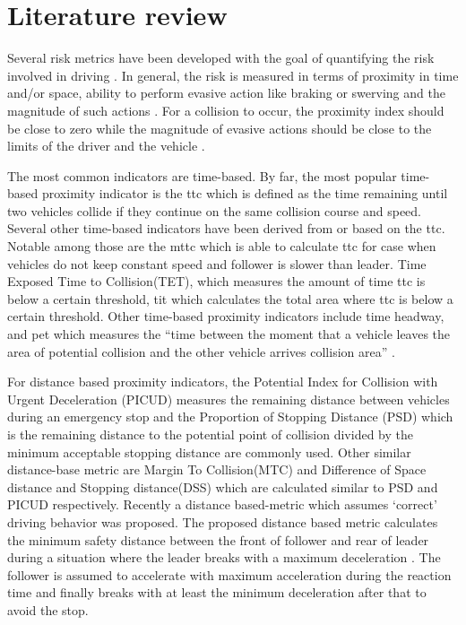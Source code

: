 \section{Literature review}
\label{sec:literature review}

Several risk metrics have been developed with the goal of quantifying the risk involved in driving \autocite{minderhoud2001extended, ozbay2008derivation, cunto2009simulated, laureshyn2010evaluation}.
In general, the risk is measured in terms of proximity in time and/or space, ability to perform evasive action like braking or swerving and the magnitude of such actions \autocite{shi2018key,zheng2020modeling}. 
For a collision to occur, the proximity index should be close to zero while the magnitude of evasive actions should be close to the limits of the driver and the vehicle \autocite{zheng2020modeling}. 

The most common indicators are time-based. By far, the most  popular time-based proximity indicator is the \ac{ttc} which  is defined as the time remaining until two vehicles collide if they continue on the same collision course and speed\autocite{van1990time,hyden1996traffic}. Several other time-based indicators have been derived from  or based on the \ac{ttc}. Notable among those are the \ac{mttc} which is able to  calculate \ac{ttc} for case when vehicles do not keep constant speed and follower is slower than leader\autocite{ozbay2008derivation}. Time Exposed Time to Collision(TET), which measures the amount of time \ac{ttc} is below a certain threshold, \ac{tit} which calculates the total area where \ac{ttc} is below a certain threshold\autocite{minderhoud2001extended}. Other time-based proximity indicators include time headway, and \ac{pet} which measures the ``time between the moment that a vehicle leaves the area of potential collision and the other vehicle arrives collision area'' \autocite{mahmud2017application}. 

For distance based proximity indicators, the Potential Index for Collision with Urgent Deceleration (PICUD) measures the remaining distance between vehicles during an emergency stop\autocite{iida2001traffic,uno2003objective} and the Proportion of Stopping Distance (PSD) which is  the remaining distance to the potential point of collision divided by the minimum acceptable stopping distance\autocite{allen1978analysis,guido2011comparing,mahmud2017application} are commonly used. Other similar distance-base metric are Margin To Collision(MTC)  and  Difference of Space distance and Stopping distance(DSS) which are calculated similar to PSD and PICUD respectively\autocite{kitajima2009estimation,okamura2011impact}. Recently a distance based-metric which assumes `correct' driving behavior was proposed\autocite{shalev2017formal}. The proposed distance based metric calculates the minimum safety distance between the front of follower and rear of leader during a situation where the leader breaks with a maximum deceleration . The follower is assumed to accelerate with maximum acceleration during the reaction time and finally breaks with at least the minimum deceleration after that to avoid the stop. 


